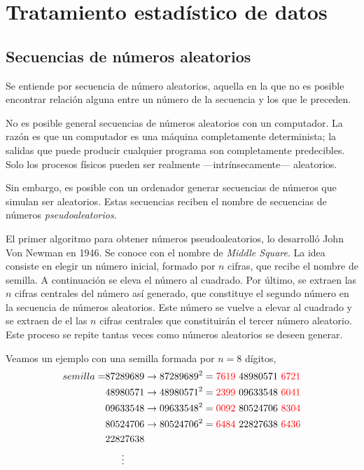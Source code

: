 \chapter{Tratamiento estadístico de datos}

\section{Secuencias de números aleatorios}


Se entiende por secuencia de número aleatorios, aquella en la que no es posible encontrar relación alguna entre un número de la secuencia y los que le preceden.

No es posible general secuencias de números aleatorios con un computador. La razón es que un computador es una máquina completamente determinista; la salidas que puede producir cualquier programa son completamente predecibles. Solo los procesos físicos pueden ser realmente ---intrínsecamente--- aleatorios.

Sin embargo, es posible con un ordenador generar secuencias de números que simulan ser aleatorios. Estas secuencias reciben el nombre de secuencias de números \emph{pseudoaleatorios}.

El primer algoritmo para obtener números pseudoaleatorios, lo desarrolló John Von Newman en 1946. Se conoce con el nombre de \emph{Middle Square}. La idea consiste en elegir un número inicial, formado por $n$ cifras, que recibe el nombre de semilla. A continuación se eleva el número al cuadrado. Por último, se extraen las $n$ cifras centrales del número así generado, que constituye el segundo número en la secuencia de números aleatorios. Este número se vuelve a elevar al cuadrado y se extraen de el las $n$ cifras centrales que constituirán el tercer número aleatorio. Este proceso se repite tantas veces como números aleatorios se deseen generar.

Veamos un ejemplo con una semilla  formada por $n=8$ dígitos,
\begin{align*}
semilla=&87289689 \rightarrow
87289689^2={\color{red}7619}\ 48980571\ {\color{red}6721}\\
&48980571\rightarrow
48980571^2={\color{red}2399}\ 09633548\ {\color{red}6041}\\
&09633548 \rightarrow
09633548^2={\color{red}0092}\ 80524706\ {\color{red}8304}\\
&80524706 \rightarrow
80524706^2={\color{red}6484}\ 22827638\ {\color{red}6436}\\
&22827638\\
&\ \ \ \ \ \vdots
\end{align*}

